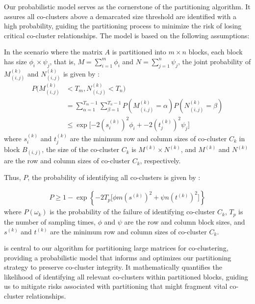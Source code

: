 \documentclass[journal]{IEEEtran}
\begin{document}
Our probabilistic model serves as the cornerstone of the partitioning algorithm. It assures all co-clusters above a demarcated size threshold are identified with a high probability, guiding the partitioning process to minimize the risk of losing critical co-cluster relationships. The model is based on the following assumptions:

In the scenario where the matrix $A$ is partitioned into $m \times n$ blocks, each block has size $\phi_i \times \psi_j$, that is, $M=\sum_{i=1}^m \phi_i$ and $N=\sum_{j=1}^n \psi_j$, the joint probability of $M_{(i,j)}^{(k)}$ and $N_{(i,j)}^{(k)}$ is given by :
\begin{equation}
    \begin{split}
        P(M_{(i,j)}^{(k)} & < T_m, N_{(i,j)}^{(k)} < T_n)                                                                           \\
                          & = \sum_{\alpha=1}^{T_m-1} \sum_{\beta=1}^{T_n-1} P(M_{(i,j)}^{(k)} = \alpha) P(N_{(i,j)}^{(k)} = \beta) \\
                          & \le \exp[-2 (s_i^{(k)})^2 \phi_i + -2 (t_j^{(k)})^2 \psi_j\rbrack
    \end{split}
\end{equation}
where $s_i^{(k)}$ and $t_j^{(k)}$ are the minimum row and column sizes of co-cluster $C_k$ in block $B_{(i,j)}$, the size of the co-cluster $C_k$ is $M^{(k)} \times N^{(k)}$, and $M^{(k)}$ and $N^{(k)}$ are the row and column sizes of co-cluster $C_k$, respectively.

Thus, $P$, the probability of identifying all co-clusters is given by :

\begin{equation}
    \begin{split}
        P \ge 1 - \exp \left\{ -2 T_p \lbrack \phi m (s^{(k)})^2 + \psi n (t^{(k)})^2\rbrack  \right\} \label{eq:prob_of_identifying_all_co_clusters}
    \end{split}
\end{equation}
where $P(\omega_k)$ is the probability of the failure of identifying co-cluster $C_k$, $T_p$ is the number of sampling times, $\phi$ and $\psi$ are the row and column block sizes, and $s^{(k)}$ and $t^{(k)}$ are the minimum row and column sizes of co-cluster $C_k$.

 is central to our algorithm for partitioning large matrices for co-clustering, providing a probabilistic model that informs and optimizes our partitioning strategy to preserve co-cluster integrity. It mathematically quantifies the likelihood of identifying all relevant co-clusters within partitioned blocks, guiding us to mitigate risks associated with partitioning that might fragment vital co-cluster relationships.
\end{document}
